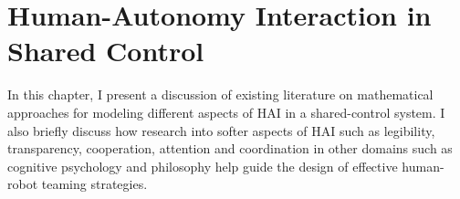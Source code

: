 \documentclass[12pt]{article}
\newcommand{\DGc}[1]{{\textbf{\color{blue}{#1}}}}
\newcommand{\POINTS}[1]{{\textbf{\color{red}{#1}}}}
\begin{document}



\pagebreak

\section{Human-Autonomy Interaction in Shared Control}
\label{sec:HRI_SA}

In this chapter, I present a discussion of existing literature on mathematical approaches for modeling different aspects of HAI in a shared-control system.  
I also briefly discuss how research into softer aspects of HAI such as legibility, transparency, cooperation, attention and coordination in other domains such as cognitive psychology and philosophy help guide the design of effective human-robot teaming strategies. 

\end{document}
